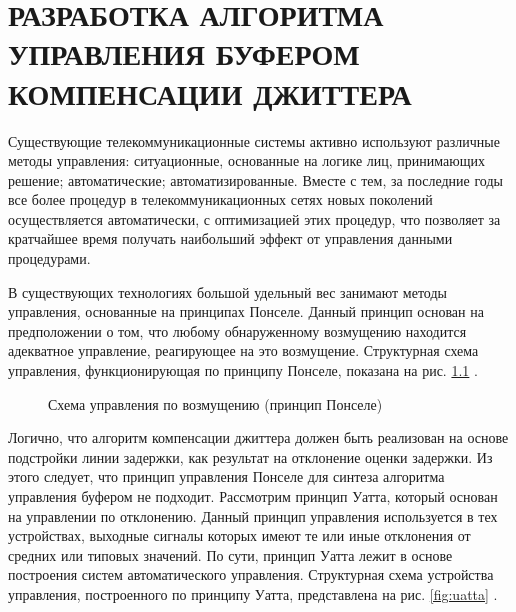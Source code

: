\chapter{РАЗРАБОТКА АЛГОРИТМА УПРАВЛЕНИЯ БУФЕРОМ КОМПЕНСАЦИИ ДЖИТТЕРА} \label{chapt:man}

Существующие телекоммуникационные системы активно используют различные методы управления: ситуационные, основанные на логике лиц, принимающих решение; автоматические; автоматизированные.
Вместе с тем, за последние годы все более процедур в телекоммуникационных сетях новых поколений осуществляется автоматически, с оптимизацией этих процедур, что позволяет за кратчайшее время получать наибольший эффект от управления данными процедурами.

В существующих технологиях большой удельный вес занимают методы управления, основанные на принципах Понселе. Данный принцип основан на предположении о том, что любому обнаруженному возмущению находится адекватное управление, реагирующее на это возмущение.
Структурная схема управления, функционирующая по принципу Понселе, показана на рис. \ref{fig:ponsele} \cite{popovski}.


\begin{figure}[!h]

\centering
{} 
\caption{Схема управления по возмущению (принцип Понселе)}
\label{fig:ponsele}
\end{figure}

Логично, что алгоритм компенсации джиттера должен быть реализован на основе подстройки линии задержки, как результат на отклонение оценки задержки. 
Из этого следует, что принцип управления Понселе для синтеза алгоритма управления буфером не подходит. 
Рассмотрим принцип Уатта, который основан на управлении по отклонению.
Данный принцип управления используется в тех устройствах, выходные сигналы которых имеют те или иные отклонения от средних  или типовых значений.
По сути, принцип Уатта лежит в основе построения систем автоматического управления. Структурная схема устройства управления, построенного по принципу Уатта, представлена на рис. \ref{fig:uatta} \cite{popovski}.


